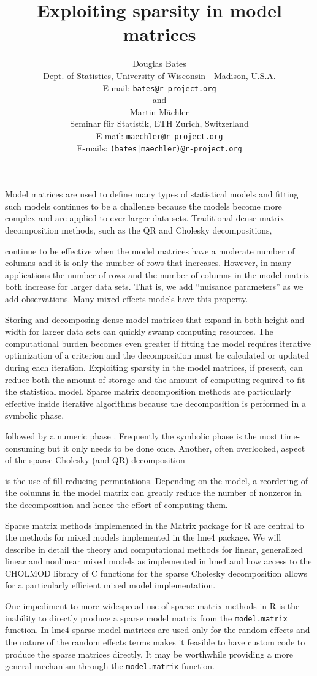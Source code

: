 \documentclass[12pt,a4paper]{article}
\title{Exploiting sparsity in model matrices}
\author{
  Douglas Bates\\
  Dept. of Statistics, University of Wisconsin - Madison, U.S.A.\\
  \iflong E-mail: \texttt{bates@r-project.org}\\ \fi
  and\\
  Martin M\"{a}chler\\
  Seminar f\"ur Statistik, ETH Zurich, Switzerland
  \iflong \\ E-mail: \texttt{maechler@r-project.org}
  \else \\[\parskip]
  E-mails: \texttt{(bates|maechler)@r-project.org}
  \fi
}
\date{} %
\newif\iflong%
\begin{document}
\maketitle\thispagestyle{empty} %
Model matrices are used to define many types of statistical models and
fitting such models continues to be a challenge because the models
become more complex and are applied to ever larger data sets.
Traditional dense matrix decomposition methods, such as the QR and
Cholesky decompositions,
\iflong perhaps augmented with accelerated BLAS or even GPU-based BLAS, \fi
continue to be effective when the model matrices
have a moderate number of columns and it is only the number of rows
that increases.  However, in many applications the number of rows
and the number of columns in the model matrix both increase for larger
data sets.  That is, we add ``nuisance parameters'' as we add
observations.  Many mixed-effects models have this property.

Storing and decomposing dense model matrices that expand in both
height and width for larger data sets can quickly swamp computing
resources.  The computational burden becomes even greater if fitting
the model requires iterative optimization of a criterion and the
decomposition must be calculated or updated during each iteration.
Exploiting sparsity in the model matrices, if present, can reduce both
the amount of storage and the amount of computing required to fit the
statistical model.  Sparse matrix decomposition methods are
particularly effective inside iterative algorithms because the
decomposition is performed in a symbolic phase,
\iflong which determines the location of the nonzeros in the result, \fi
followed by a numeric phase%
\iflong\ to determine the actual values in those positions\fi.
Frequently the
symbolic phase is the most time-consuming but it only needs to be done
once.  Another, often overlooked, aspect of the sparse Cholesky
\iflong\else (and QR) \fi
decomposition
\iflong (and, to a lesser extent, the sparse QR decomposition) \fi
is the use of fill-reducing permutations.  Depending on the model, a
reordering of the columns in the model matrix can greatly reduce the
number of nonzeros in the decomposition and hence the
\iflong amount of computing required to determine these values.
\else effort of computing them. \fi

Sparse matrix methods implemented in the Matrix package for R are
central to the methods for mixed models implemented in the lme4
package.  We will describe in detail the theory and computational
methods for linear, generalized linear and nonlinear mixed models as
implemented in lme4 and how access to the CHOLMOD library of C
functions for the sparse Cholesky decomposition allows for a
particularly efficient mixed model implementation.

One impediment to more widespread use of sparse matrix methods in R is
the inability to directly produce a sparse model matrix from the
\texttt{model.matrix} function.  In lme4 sparse model matrices are used only
for the random effects and the nature of the random effects terms
makes it feasible to have custom code to produce the sparse matrices
directly.  It may be worthwhile providing a more general mechanism
through the \texttt{model.matrix} function.
\end{document}
